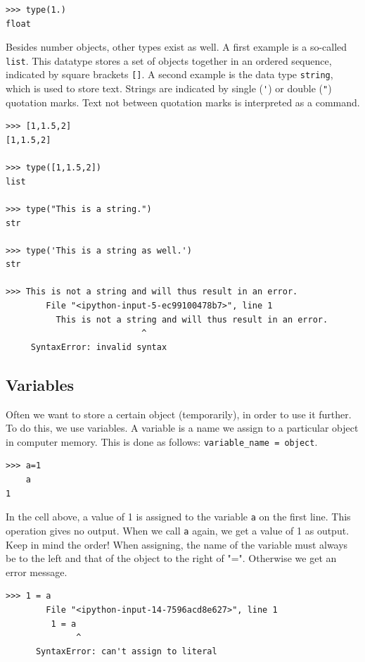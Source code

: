 \begin{lstlisting}[]
>>> type(1.)
float
\end{lstlisting}

Besides number objects, other types exist as well. A first example is a so-called \lstinline|list|. This datatype stores a set of objects together in an ordered sequence, indicated by square brackets \lstinline|[]|. A second example is the data type \lstinline|string|, which is used to store text. Strings are indicated by single (\lstinline|'|) or double (\lstinline|"|) quotation marks. Text not between quotation marks is interpreted as a command.

\begin{lstlisting}[]
>>> [1,1.5,2]
[1,1.5,2]

>>> type([1,1.5,2])
list

>>> type("This is a string.")
str

>>> type('This is a string as well.')
str

>>> This is not a string and will thus result in an error.
        File "<ipython-input-5-ec99100478b7>", line 1
          This is not a string and will thus result in an error.
                           ^
     SyntaxError: invalid syntax
\end{lstlisting}

\subsection{Variables}

Often we want to store a certain object (temporarily), in order to use it further. To do this, we use variables. A variable is a name we assign to a particular object in computer memory. This is done as follows: 
\lstinline|variable_name = object|.

\begin{lstlisting}[]
>>> a=1
    a
1
\end{lstlisting}

In the cell above, a value of 1 is assigned to the variable \lstinline|a| on the first line. This operation gives no output. When we call \lstinline|a| again, we get a value of 1 as output. Keep in mind the order! When assigning, the name of the variable must always be to the left and that of the object to the right of "=". Otherwise we get an error message.
\begin{lstlisting}[]
>>> 1 = a
        File "<ipython-input-14-7596acd8e627>", line 1
         1 = a
              ^
      SyntaxError: can't assign to literal
\end{lstlisting}


